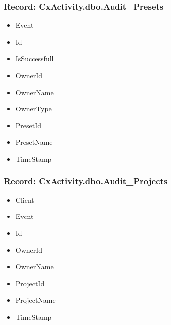 \subsubsection{Record: CxActivity.dbo.Audit\_Presets}

\begin{itemize}
    \item Event
    \item Id
    \item IsSuccessfull
    \item OwnerId
    \item OwnerName
    \item OwnerType
    \item PresetId
    \item PresetName
    \item TimeStamp
\end{itemize}


\subsubsection{Record: CxActivity.dbo.Audit\_Projects}
\begin{itemize}
    \item Client
    \item Event
    \item Id
    \item OwnerId
    \item OwnerName
    \item ProjectId
    \item ProjectName
    \item TimeStamp
\end{itemize}


